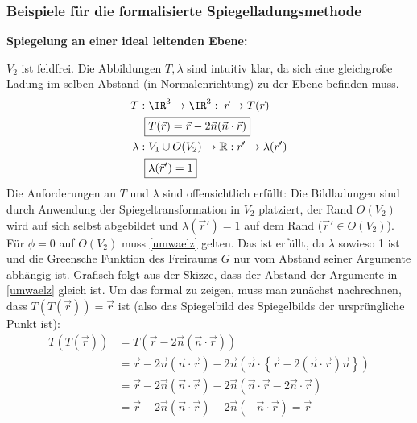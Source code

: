 		    \subsubsection{Beispiele für die formalisierte Spiegelladungsmethode}\label{bspSpieg}
		    \textbf{Spiegelung an einer ideal leitenden Ebene:}\\
		  \begin{center}
		  	
		  \end{center}
		  $V_2$ ist feldfrei. Die Abbildungen $T,\lambda$ sind intuitiv klar, da sich eine gleichgroße Ladung im selben Abstand (in Normalenrichtung) zu der Ebene befinden muss.
		  	\begin{equation}\begin{split}
		  			T:\; &\IR^3\to\IR^3: \; \vec{r}  \to T(\vec{r} ) \\
		  			\Aboxed{&T(\vec{r} ) = \vec{r}  - 2 \vec{n} (\vec{n}\cdot \vec{r} )}\\
		  			\lambda:\; &V_1\cup O(V_2) \to \mathbb{R}: \vec{r}'  \to \lambda(\vec{r}' )\\
		  			\Aboxed{&\lambda(\vec{r}' ) = 1}
		  	\end{split}\end{equation}
		  	 Die Anforderungen an $T$ und $\lambda$ sind offensichtlich erfüllt: Die Bildladungen sind durch Anwendung der Spiegeltransformation in $V_2$ platziert, der Rand $O(V_2)$ wird auf sich selbst abgebildet und  $\lambda(\vec{r}' ) = 1$ auf dem Rand ($\vec{r}'  \in O(V_2)$).	\\	  		  
		  	 Für $\phi = 0$ auf $O(V_2)$ muss \ref{umwaelz} gelten. Das ist erfüllt, da $\lambda$ sowieso 1 ist und die Greensche Funktion des Freiraums $G$ nur vom Abstand seiner Argumente abhängig ist. Grafisch folgt aus der Skizze, dass der Abstand der Argumente in \ref{umwaelz} gleich ist. Um das formal zu zeigen, muss man zunächst nachrechnen, dass $T(T(\vec{r} )) = \vec{r} $ ist (also das Spiegelbild des Spiegelbilds der ursprüngliche Punkt ist):
		  	\begin{equation}\begin{split}
		  			T(T(\vec{r} )) &= T(\vec{r}  - 2 \vec{n} (\vec{n}\cdot \vec{r} ))\\
		  			& = \vec{r}  - 2 \vec{n} (\vec{n}\cdot \vec{r} ) - 2 \vec{n} (\vec{n}\cdot \left\{ \vec{r}  - 2 (\vec{n}\cdot \vec{r} ) \vec{n}  \right\} )  \\
		  			& = \vec{r}  - 2 \vec{n} (\vec{n}\cdot \vec{r} ) - 2 \vec{n} (\vec{n}\cdot \vec{r}  - 2 \vec{n}\cdot \vec{r} )\\
		  			& = \vec{r}  - 2 \vec{n} (\vec{n}\cdot \vec{r} ) - 2 \vec{n} (- \vec{n}\cdot \vec{r} ) = \vec{r}
		  	\end{split}\end{equation}
